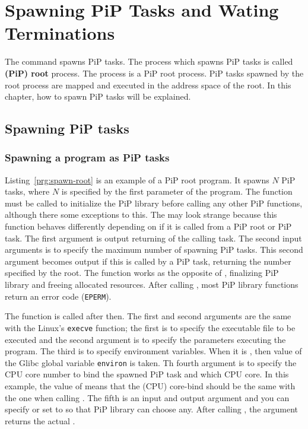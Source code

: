 
\section{Spawning PiP Tasks and Wating Terminations}

The  command spawns PiP tasks. The
process which spawns PiP tasks is called {\bf (PiP) root} process. The
 process is a PiP root process. 
PiP tasks spawned by the root process are mapped and executed in the
address space of the root. In this chapter, how to spawn PiP tasks
will be explained.

\subsection{Spawning PiP tasks}

\subsubsection{Spawning a program as PiP tasks}

Listing~\ref{prg:spawn-root} is an example of a PiP root program. It
spawns $N$ PiP tasks, where $N$ is specified by the first parameter
of the program. The  function must be called to
initialize the PiP library before calling any other PiP functions,
although there some exceptions to this. The  may
look strange because this function behaves differently depending
on if it is called from a PiP root or PiP task. The first argument is
output returning {\PIPID} of the calling task. The second input
arguments is to specify the maximum number of spawning PiP tasks. This
second argument becomes output if this is called by a PiP task,
returning the number specified by the root.
The  function works as the opposite of
, finalizing PiP library and freeing allocated 
resources. After calling , most PiP library
functions return an error code ({\tt EPERM}).

The  function is called after then. The first and
second arguments are the same with the Linux's {\tt execve}
function; the first is to specify the executable file to be executed
and the second argument is to specify the parameters executing the
program. The third is to specify environment variables. When it is
{\NULL}, then value of the Glibc global variable {\tt environ} is
taken. Th fourth argument is to specify the CPU core number to bind
the spawned PiP task and which CPU core. In this example, the value of
 means that the (CPU) core-bind should be
the same with the one when calling . The fifth
is an input and output argument and you can specify {\PIPID} or
set to  so that PiP library can choose
any. After calling , the argument returns the
actual {\PIPID}. 

